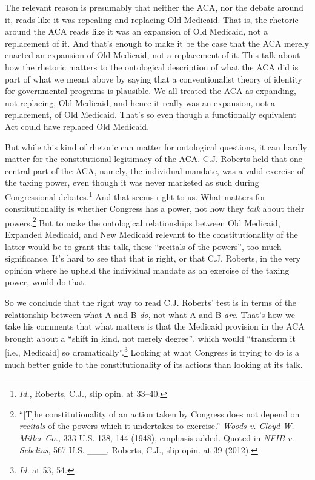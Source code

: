 \documentclass[
  10pt,
  letterpaper,
  DIV=11,
  numbers=noendperiod,
  twoside]{scrartcl}
\begin{document}
The relevant reason is presumably that neither the ACA, nor the debate
around it, reads like it was repealing and replacing Old Medicaid. That
is, the rhetoric around the ACA reads like it was an expansion of Old
Medicaid, not a replacement of it. And that's enough to make it be the
case that the ACA merely enacted an expansion of Old Medicaid, not a
replacement of it. This talk about how the rhetoric matters to the
ontological description of what the ACA did is part of what we meant
above by saying that a conventionalist theory of identity for
governmental programs is plausible. We all treated the ACA as expanding,
not replacing, Old Medicaid, and hence it really was an expansion, not a
replacement, of Old Medicaid. That's so even though a functionally
equivalent Act could have replaced Old Medicaid.

But while this kind of rhetoric can matter for ontological questions, it
can hardly matter for the constitutional legitimacy of the ACA. C.J.
Roberts held that one central part of the ACA, namely, the individual
mandate, was a valid exercise of the taxing power, even though it was
never marketed as such during Congressional debates.\footnote{\emph{Id.},
  Roberts, C.J., slip opin. at 33--40.} And that seems right to us. What
matters for constitutionality is whether Congress has a power, not how
they \emph{talk} about their powers.\footnote{``{[}T{]}he
  constitutionality of an action taken by Congress does not depend on
  \emph{recitals} of the powers which it undertakes to exercise.''
  \emph{Woods v. Cloyd W. Miller Co.,} 333 U.S. 138, 144 (1948),
  emphasis added. Quoted in \emph{NFIB v. Sebelius}, 567 U.S. \_\_\_,
  Roberts, C.J., slip opin. at 39 (2012).} But to make the ontological
relationships between Old Medicaid, Expanded Medicaid, and New Medicaid
relevant to the constitutionality of the latter would be to grant this
talk, these ``recitals of the powers'', too much significance. It's hard
to see that that is right, or that C.J. Roberts, in the very opinion
where he upheld the individual mandate as an exercise of the taxing
power, would do that.

So we conclude that the right way to read C.J. Roberts' test is in terms
of the relationship between what A and B \emph{do}, not what A and B
\emph{are}. That's how we take his comments that what matters is that
the Medicaid provision in the ACA brought about a ``shift in kind, not
merely degree'', which would ``transform it {[}i.e., Medicaid{]} so
dramatically''.\footnote{\emph{Id.} at 53, 54.} Looking at what Congress
is trying to do is a much better guide to the constitutionality of its
actions than looking at its talk.
\end{document}
